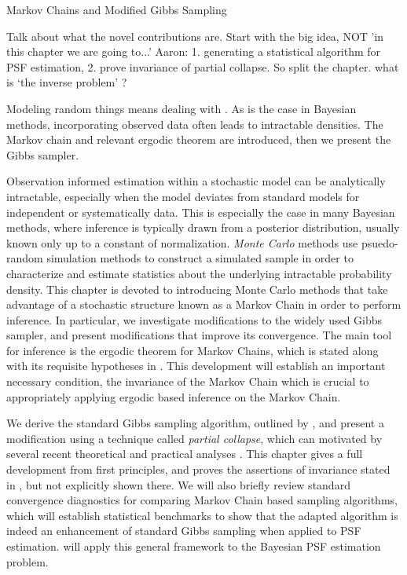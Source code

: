 \setlength{\parindent}{2ex}
\newcommand{\Ab}{{\bf A}}
\newcommand{\N}{\mathcal{N}}
\begin{chapter}{Markov Chains and Modified Gibbs Sampling}\label{chapter:mcmctheory}
\begin{com} 
  Talk about what the novel contributions are.
  Start with the big idea, NOT 'in this chapter we are going to...'
  Aaron: 1. generating a statistical algorithm for PSF estimation, 2. prove invariance of partial collapse.
  So split the chapter.
  what is `the inverse problem' ?
\end{com}

\begin{com}
Modeling random things means dealing with .
  As is the case in Bayesian methods, incorporating observed data often leads to intractable densities.
  The Markov chain and relevant ergodic theorem are introduced, then we present the Gibbs sampler.
\end{com}

Observation informed estimation within a stochastic model can be analytically intractable, especially when the model deviates from standard models for independent or systematically data.
This is especially the case in many Bayesian methods, where inference is typically drawn from a posterior distribution, usually known only up to a constant of normalization.
\emph{Monte Carlo} methods use psuedo-random simulation methods to construct a simulated sample in order to characterize and estimate statistics about the underlying intractable probability density.
This chapter is devoted to introducing Monte Carlo methods that take advantage of a stochastic structure known as a Markov Chain in order to perform inference.
In particular, we investigate modifications to the widely used Gibbs sampler, and present modifications that improve its convergence.
The main tool for inference is the ergodic theorem for Markov Chains, which is stated along with its requisite hypotheses in .
This development will establish an important necessary condition, the invariance of the Markov Chain which is crucial to appropriately applying ergodic based inference on the Markov Chain.

We derive the standard Gibbs sampling algorithm, outlined by \citep{geman1984stochastic}, and present a modification using a technique called \emph{partial collapse}, which can motivated by several recent theoretical and practical analyses \citep{van2008partially,agapiou2014analysis,fox2015fast}.
This chapter gives a full development from first principles, and proves the assertions of invariance stated in \citep{van2008partially}, but not explicitly shown there.
We will also briefly review standard convergence diagnostics for comparing Markov Chain based sampling algorithms, which will establish statistical benchmarks to show that the adapted algorithm is indeed an enhancement of standard Gibbs sampling when applied to PSF estimation.  
 will apply this general framework to the Bayesian PSF estimation problem.


\end{chapter}
